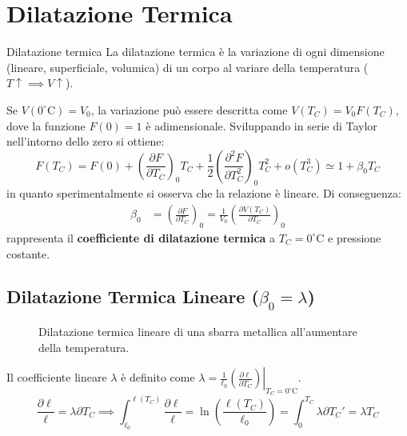 \section{Dilatazione Termica}
\begin{definizione}{Dilatazione termica}
La dilatazione termica è la variazione di ogni dimensione (lineare, superficiale, volumica) di un corpo al variare della temperatura ($T \uparrow \implies V \uparrow$).
\end{definizione}

\medskip
Se $V(0^\circ\text{C}) = V_0$, la variazione può essere descritta come $V(T_C) = V_0 F(T_C)$, dove la funzione $F(0) = 1$ è adimensionale.
Sviluppando in serie di Taylor nell'intorno dello zero si ottiene:
\begin{equation}
F(T_C) = F(0) + \left(\frac{\partial F}{\partial T_C}\right)_0 T_C + \frac{1}{2} \left(\frac{\partial^2 F}{\partial T_C^2}\right)_0 T_C^2 + o(T_C^3) \simeq 1 + \beta_0 T_C
\end{equation}
in quanto sperimentalmente si osserva che la relazione è lineare. Di conseguenza:
\begin{align}
\beta_0 &= \left(\frac{\partial F}{\partial T_C}\right)_0 = \frac{1}{V_0} \left(\frac{\partial V(T_C)}{\partial T_C}\right)_0 
\end{align}
rappresenta il \textbf{coefficiente di dilatazione termica} a $T_C = 0^\circ\text{C}$ e pressione costante.

\subsection{Dilatazione Termica Lineare ($\beta_0 = \lambda$)}
\begin{figure}[ht]
\centering
{}
\caption{Dilatazione termica lineare di una sbarra metallica all'aumentare della temperatura.}
\end{figure}

Il coefficiente lineare $\lambda$ è definito come $\lambda = \frac{1}{\ell_0} \left. \left( \frac{\partial \ell}{\partial T_C} \right) \right|_{T_C = 0^\circ\text{C}}$.
\begin{equation}
\frac{\partial \ell}{\ell} = \lambda \partial T_C \implies \int_{\ell_0}^{\ell(T_C)} \frac{\partial \ell}{\ell} = \ln \left( \frac{\ell(T_C)}{\ell_0} \right) = \int_0^{T_C} \lambda \partial T_C' = \lambda T_C
\end{equation}


